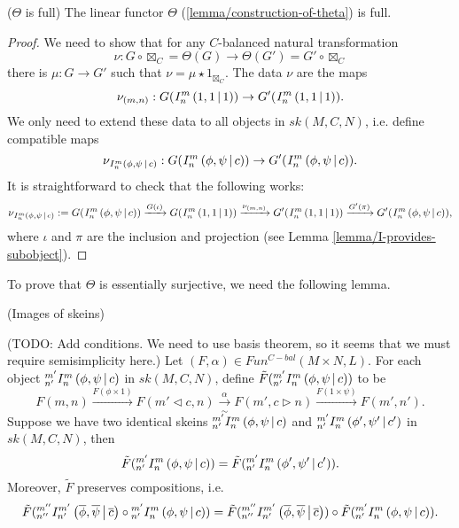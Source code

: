 \begin{lemma}\label{lemma/theta-is-full} ($\Theta$ is full)
  The linear functor $\Theta$ (\ref{lemma/construction-of-theta}) is full.
\end{lemma}

\begin{proof}
  We need to show that for any $C$-balanced natural transformation
  \[
    \nu: G \circ \boxtimes_{C} = \Theta(G) \to \Theta(G') = G' \circ \boxtimes_{C}
  \]
  there is $\mu: G \to G'$ such that $\nu = \mu \star 1_{\boxtimes_{C}}$. The data $\nu$ are the maps
  \[
    \nu_{(m,n)}: G({}^{}_{} I^{m}_{n} \left( 1, 1 \,\middle|\, 1 \right)) \to G'({}^{}_{} I^{m}_{n} \left( 1, 1 \,\middle|\, 1 \right)).
  \]
  We only need to extend these data to all objects in $sk(M,C,N)$, i.e. define compatible maps
  \[
    \nu_{{}^{}_{} I^{m}_{n} \left( \phi, \psi \,\middle|\, c \right)}: G({}^{}_{} I^{m}_{n} \left( \phi, \psi \,\middle|\, c \right)) \to G'({}^{}_{} I^{m}_{n} \left( \phi, \psi \,\middle|\, c \right)).
  \]
  It is straightforward to check that the following works:
  \[
    \nu_{{}^{}_{} I^{m}_{n} \left( \phi, \psi \,\middle|\, c \right)}:= G({}^{}_{} I^{m}_{n} \left( \phi, \psi \,\middle|\, c \right))
    \xrightarrow{G(\iota)}
    G({}^{}_{} I^{m}_{n} \left( 1, 1 \,\middle|\, 1 \right))
    \xrightarrow{\nu_{(m,n)}}
    G'({}^{}_{} I^{m}_{n} \left( 1, 1 \,\middle|\, 1 \right))
    \xrightarrow{G'(\pi)}
    G'({}^{}_{} I^{m}_{n} \left( \phi, \psi \,\middle|\, c \right)),
  \]
  where $\iota$ and $\pi$ are the inclusion and projection (see
  Lemma \ref{lemma/I-provides-subobject}).
\end{proof}

To prove that $\Theta$ is essentially surjective, we need the following lemma.
\begin{lemma} (Images of skeins) \label{lemma/image-of-skein}

  \noindent (TODO: Add conditions. We need to use basis theorem, so it seems
  that we must require semisimplicity here.) Let
  $(F,\alpha) \in Fun^{C-bal}(M \times N, L)$. For each object
  ${}^{m'}_{n'} I^{m}_{n} \left( \phi, \psi \,\middle|\, c \right)$ in $sk(M,C,N)$, define
  $\tilde{F}({}^{m'}_{n'} I^{m}_{n} \left( \phi, \psi \,\middle|\, c \right))$ to be
  \[
    F(m,n)
    \xrightarrow{F(\phi \times 1)}
    F(m' \lhd c, n)
    \xrightarrow[\sim]{\alpha}
    F(m', c \rhd n)
    \xrightarrow{F(1 \times \psi)}
    F(m',n').
  \]
  Suppose we have two identical skeins ${}^{m'}_{n'} I^{m}_{n} \left( \phi, \psi \,\middle|\, c \right)$ and $ {}^{m'}_{n'} I^{m}_{n} \left( \phi', \psi' \,\middle|\, c' \right)$ in
  $sk(M,C,N)$, then
  \[
    \tilde{F}({}^{m'}_{n'} I^{m}_{n} \left( \phi, \psi \,\middle|\, c \right)) = \tilde{F}({}^{m'}_{n'} I^{m}_{n} \left( \phi', \psi' \,\middle|\, c' \right)).
  \]
  Moreover, $\tilde{F}$ preserves compositions, i.e.
  \[
    \tilde{F}({}^{m''}_{n''} I^{m'}_{n'} \left( \overline{\phi}, \overline{\psi} \,\middle|\, \overline{c} \right) \circ {}^{m'}_{n'} I^{m}_{n} \left( \phi, \psi \,\middle|\, c \right))
    = \tilde{F}({}^{m''}_{n''} I^{m'}_{n'} \left( \overline{\phi}, \overline{\psi} \,\middle|\, \overline{c} \right))
    \circ
    \tilde{F}({}^{m'}_{n'} I^{m}_{n} \left( \phi, \psi \,\middle|\, c \right)).
  \]
\end{lemma}

